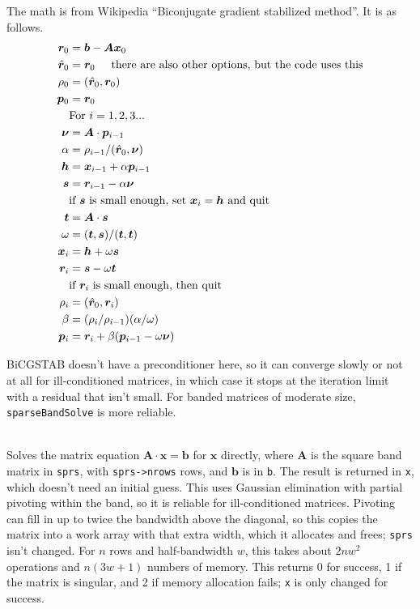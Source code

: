 \documentclass[11pt]{article}
\newcommand {\ttt} {\texttt}
\begin{document}
\begin{description}
The math is from Wikipedia ``Biconjugate gradient stabilized method''. It is as follows.
\begin{align*}
\bm{r}_0 &= \bm{b}-\bm{A}\bm{x}_0 \\
\hat{\bm{r}}_0 &= \bm{r}_0 \hspace{0.5cm} \textrm{there are also other options, but the code uses this} \\
\rho_0 &= (\hat{\bm{r}}_0, \bm{r}_0) \\
\bm{p}_0 &= \bm{r}_0 \\
&\textrm{For } i=1,2,3... \\
\bm{\nu} &= \bm{A} \cdot \bm{p}_{i-1} \\
\alpha &= \rho_{i-1}/(\hat{\bm{r}}_0, \bm{\nu}) \\
\bm{h} &= \bm{x}_{i-1} + \alpha \bm{p}_{i-1} \\
\bm{s} &= \bm{r}_{i-1} - \alpha \bm{\nu} \\
& \textrm{if $\bm{s}$ is small enough, set $\bm{x}_i = \bm{h}$ and quit} \\
\bm{t} &= \bm{A} \cdot \bm{s} \\
\omega &= (\bm{t}, \bm{s}) / (\bm{t}, \bm{t}) \\
\bm{x}_i &= \bm{h} + \omega \bm{s} \\
\bm{r}_i &= \bm{s} - \omega \bm{t} \\
& \textrm{if $\bm{r}_i$ is small enough, then quit} \\
\rho_i &= (\hat{\bm{r}}_0, \bm{r}_i) \\
\beta &= (\rho_i/\rho_{i-1})(\alpha/\omega) \\
\bm{p}_i &= \bm{r}_i + \beta(\bm{p}_{i-1}-\omega\bm{\nu})
\end{align*}

BiCGSTAB doesn't have a preconditioner here, so it can converge slowly or not at all for ill-conditioned matrices, in which case it stops at the iteration limit with a residual that isn't small. For banded matrices of moderate size, \ttt{sparseBandSolve} is more reliable.

\item[\ttt{int sparseBandSolve(const sparsematrix sprs,const double *b,double *x)}]
\hfill \\
Solves the matrix equation $\bm{A}\cdot \bm{x} = \bm{b}$ for $\bm{x}$ directly, where $\bm{A}$ is the square band matrix in \ttt{sprs}, with \ttt{sprs->nrows} rows, and $\bm{b}$ is in \ttt{b}. The result is returned in \ttt{x}, which doesn't need an initial guess. This uses Gaussian elimination with partial pivoting within the band, so it is reliable for ill-conditioned matrices. Pivoting can fill in up to twice the bandwidth above the diagonal, so this copies the matrix into a work array with that extra width, which it allocates and frees; \ttt{sprs} isn't changed. For $n$ rows and half-bandwidth $w$, this takes about $2nw^2$ operations and $n(3w+1)$ numbers of memory. This returns 0 for success, 1 if the matrix is singular, and 2 if memory allocation fails; \ttt{x} is only changed for success.




\end{description}



\end{document}

